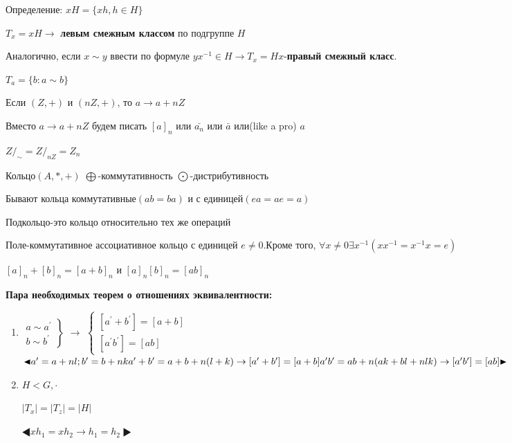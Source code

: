 \documentclass[12pt]{article}
\begin{document}
		Определение: $xH=\{xh, h\in H\}$
		
		$T_x=xH \rightarrow$ \hypertarget{indef:left_class}{\textbf{левым смежным классом}} по подгруппе $H$
		
		Аналогично, если $ x\sim y$ ввести по формуле $yx^{-1}\in H\rightarrow T_x=Hx$-\hypertarget{indef:right_class}{\textbf{правый смежный класс}}.
		
		
		
		
	
		
		$T_a=\{b:a\sim b\} $
		
		
		Если $(Z,+)$ и $(nZ,+)$, то $a\rightarrow a+nZ$
		
		Вместо $a\rightarrow a+nZ$ будем писать $[a]_n$ или $ \bar{a_n}$ или $\bar{a}$ или(like a pro) $a$
		
		$Z/_{\sim}=Z/_{nZ}=Z_n$
		
		Кольцо$(A,*,+)$
		$\bigoplus$-коммутативность
		$\bigodot$-дистрибутивность
		
		Бывают кольца коммутативные$(ab=ba)$ и с единицей$(ea=ae=a)$
		
		Подкольцо-это кольцо относительно тех же операций
		
		Поле-коммутативное ассоциативное кольцо с единицей $e\not= 0$.Кроме того, $\forall x\not=0 \exists x^{-1} (xx^{-1}=x^{-1}x=e)$
		
		$[a]_n+[b]_n=[a+b]_n$ и $[a]_n [b]_n=[ab]_n$
		
		\textbf{Пара необходимых теорем о отношениях эквивалентности:}
		\begin{enumerate}
					
		
		\item $	\left
			.\begin{aligned}
			a\sim a^\prime \\
			b\sim b^\prime
			\end{aligned}
			\right \} $
			$\rightarrow$
			$\begin{cases}
			[a^\prime +b^\prime]=[a+b] \\
			[a^\prime b^\prime]=[ab]
			\end{cases}$\\
		$\LHD a^\prime =a+nl; b^\prime=b+nk \\
		a^\prime+b^\prime=a+b+n(l+k)\rightarrow [a^\prime+b^\prime]=[a+b] \\
		a^\prime b^\prime=ab+n(ak+bl+nlk)\rightarrow [a^\prime b^\prime]=[ab]
		\RHD$
		
		\item $H<G,\cdot$
		
		
			$|T_x|=|T_z|=|H|$
		
		
		$\LHD xh_1=xh_2 \rightarrow h_1=h_2 \RHD$
		\end{enumerate}
		
\end{document}
